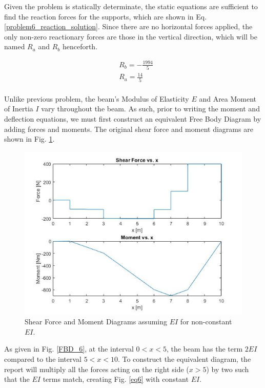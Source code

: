 \documentclass[a4paper]{article}
\begin{document}
Given the problem is statically determinate, the static equations are sufficient to find the reaction forces for the supports, which are shown in Eq. \ref{problem6_reaction_solution}. Since there are no horizontal forces applied, the only non-zero reactionary forces are those in the vertical direction, which will be named $R_a$ and $R_b$ henceforth.

\begin{equation}
\begin{split}
	& R_b = -\frac{1994}{5} \\
	& R_a = \frac{14}{5} \\
\end{split}
\label{problem6_reaction_solution}
\end{equation}

Unlike previous problem, the beam's Modulus of Elasticity $E$ and Area Moment of Inertia $I$ vary throughout the beam. As such, prior to writing the moment and deflection equations, we must first construct an equivalent Free Body Diagram by adding forces and moments. The original shear force and moment diagrams are shown in Fig. \ref{noneq6}.

\begin{figure}[h]
\includegraphics[width=\textwidth]{results/noneq6.jpg}
\caption{Shear Force and Moment Diagrams assuming $EI$ for non-constant $EI$.}
\label{noneq6}
\end{figure}

As given in Fig. \ref{FBD_6}, at the interval $0<x<5$, the beam has the term $2EI$ compared to the interval $5<x<10$. To construct the equivalent diagram, the report will multiply all the forces acting on the right side ($x>5$) by two such that the $EI$ terms match, creating Fig. \ref{eq6} with constant $EI$.
\end{document}
